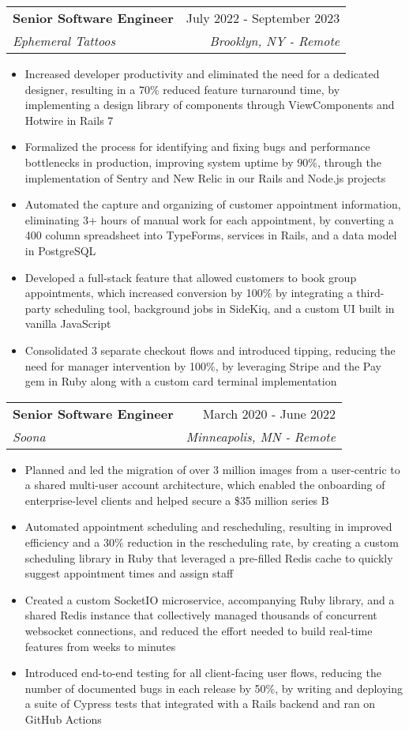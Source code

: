 \documentclass[letterpaper,11pt]{article}
\makeatletter
\newcommand{\resumeItem}[1]{
  \item\small{
    {#1 \vspace{-2pt}}
  }
}
\newcommand{\resumeSubheading}[4]{
  \vspace{-2pt}\item
    \begin{tabular*}{0.97\textwidth}[t]{l@{\extracolsep{\fill}}r}
      \textbf{#1} & #2 \\
      \textit{\small#3} & \textit{\small #4} \\
    \end{tabular*}\vspace{-7pt}
}
\newcommand{\resumeItemListStart}{\begin{itemize}}
\newcommand{\resumeItemListEnd}{\end{itemize}\vspace{-5pt}}
\makeatother
\begin{document}
    \resumeSubheading
      {Senior Software Engineer}{July 2022 - September 2023}
      {Ephemeral Tattoos}{Brooklyn, NY - Remote}
      \resumeItemListStart
        \resumeItem{Increased developer productivity and eliminated the need for a dedicated designer, resulting in a 70\% reduced feature turnaround time, by implementing a design library of components through ViewComponents and Hotwire in Rails 7}
        \resumeItem{Formalized the process for identifying and fixing bugs and performance bottlenecks in production, improving system uptime by 90\%, through the implementation of Sentry and New Relic in our Rails and Node.js projects}
        \resumeItem{Automated the capture and organizing of customer appointment information, eliminating 3+ hours of manual work for each appointment, by converting a 400 column spreadsheet into TypeForms, services in Rails, and a data model in PostgreSQL}
        \resumeItem{Developed a full-stack feature that allowed customers to book group appointments, which increased conversion by 100\% by integrating a third-party scheduling tool, background jobs in SideKiq, and a custom UI built in vanilla JavaScript}
        \resumeItem{Consolidated 3 separate checkout flows and introduced tipping, reducing the need for manager intervention by 100\%, by leveraging Stripe and the Pay gem in Ruby along with a custom card terminal implementation}
      \resumeItemListEnd

    \resumeSubheading
      {Senior Software Engineer}{March 2020 - June 2022}
      {Soona}{Minneapolis, MN - Remote}
      \resumeItemListStart
        \resumeItem{Planned and led the migration of over 3 million images from a user-centric to a shared multi-user account architecture, which enabled the onboarding of enterprise-level clients and helped secure a \$35 million series B}
        \resumeItem{Automated appointment scheduling and rescheduling, resulting in improved efficiency and a 30\% reduction in the rescheduling rate, by creating a custom scheduling library in Ruby that leveraged a pre-filled Redis cache to quickly suggest appointment times and assign staff}
        \resumeItem{Created a custom SocketIO microservice, accompanying Ruby library, and a shared Redis instance that collectively managed thousands of concurrent websocket connections, and reduced the effort needed to build real-time features from weeks to minutes}
        \resumeItem{Introduced end-to-end testing for all client-facing user flows, reducing the number of documented bugs in each release by 50\%, by writing and deploying a suite of Cypress tests that integrated with a Rails backend and ran on GitHub Actions}
      \resumeItemListEnd
\end{document}
